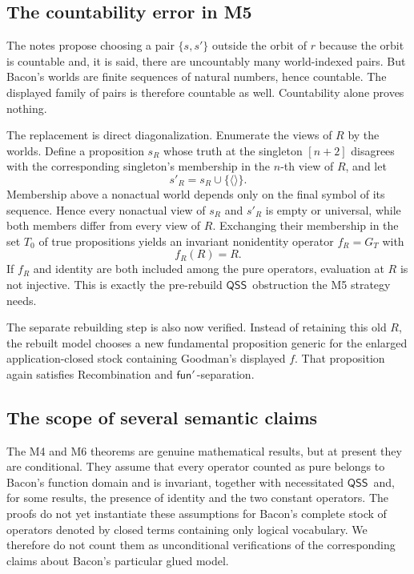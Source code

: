 \documentclass[12pt,leqno]{article}
\theoremstyle{plain}
\theoremstyle{definition}
\newcommand{\funp}{\ensuremath{\mathsf{fun}'\,}}
\newcommand{\QSS}{\ensuremath{\mathsf{QSS}}}
\begin{document}
\subsection{The countability error in M5}

The notes propose choosing a pair \(\{s,s'\}\) outside the orbit of \(r\)
because the orbit is countable and, it is said, there are uncountably many
world-indexed pairs.  But Bacon's worlds are finite sequences of natural
numbers, hence countable.  The displayed family of pairs is therefore
countable as well.  Countability alone proves nothing.

The replacement is direct diagonalization.  Enumerate the views of \(R\) by
the worlds.  Define a proposition \(s_R\) whose truth at the singleton
\([n+2]\) disagrees with the corresponding singleton's membership in the
\(n\)-th view of \(R\), and let
\[
 s'_R=s_R\cup\{\langle\rangle\}.
\]
Membership above a nonactual world depends only on the final symbol of its
sequence.  Hence every nonactual view of \(s_R\) and \(s'_R\) is empty or
universal, while both members differ from every view of \(R\).  Exchanging
their membership in the set \(T_0\) of true propositions yields an invariant
nonidentity operator \(f_R=G_T\) with
\[
 f_R(R)=R.
\]
If \(f_R\) and identity are both included among the pure operators, evaluation at \(R\) is not
injective.  This is exactly the pre-rebuild \QSS\ obstruction the M5 strategy
needs.

The separate rebuilding step is also now verified.  Instead of retaining
this old \(R\), the rebuilt model chooses a new fundamental proposition
generic for the enlarged application-closed stock containing Goodman's
displayed \(f\).  That proposition again satisfies Recombination and
\(\funp\)-separation.

\subsection{The scope of several semantic claims}

The M4 and M6 theorems are genuine mathematical results, but at present they
are conditional.  They assume that every operator counted as pure belongs to
Bacon's function domain and is invariant, together with necessitated \QSS\
and, for some results, the presence of identity and the two constant
operators.
The proofs do not yet instantiate these assumptions for Bacon's complete
stock of operators denoted by closed terms containing only logical
vocabulary.  We therefore do not count them as unconditional
verifications of the corresponding claims about Bacon's particular glued
model.
\end{document}

